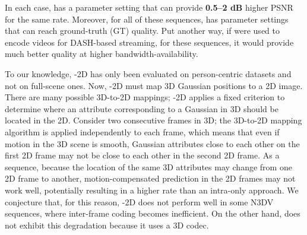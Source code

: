 In each case, \gsnfs{} has a parameter setting that can provide \textbf{0.5--2 dB} higher PSNR for the same rate.
%
Moreover, for all of these sequences, \gsnfs{} has parameter settings that can reach ground-truth (GT) quality.
%
Put another way, if \gsnfs{} were used to encode videos for DASH-based \dgs{} streaming, for these sequences, it would provide much better quality at higher bandwidth-availability.

To our knowledge, \vthree{}-2D has only been evaluated on person-centric datasets and not on full-scene ones.
%
Now, \vthree{}-2D must map 3D Gaussian positions to a 2D image.
%
%
%
%
There are many possible 3D-to-2D mappings; \vthree{}-2D applies a fixed criterion to determine where an attribute corresponding to a Gaussian in 3D should be located in the 2D.
%
Consider two consecutive frames in 3D; the 3D-to-2D mapping algorithm is applied independently to each frame, which means that even if motion in the 3D scene is smooth, Gaussian attributes close to each other on the first 2D frame may not be close to each other in the second 2D frame. 
%
As a sequence, because the location of the same 3D attributes may change from one 2D frame to another, motion-compensated prediction in the 2D frames may not work well, potentially resulting in a higher rate than an intra-only approach. 
%
We conjecture that, for this reason, \vthree{}-2D does not perform well in some N3DV sequences, where inter-frame coding becomes inefficient.
%
On the other hand, \gsnfs{} does not exhibit this degradation because it uses a 3D codec.

